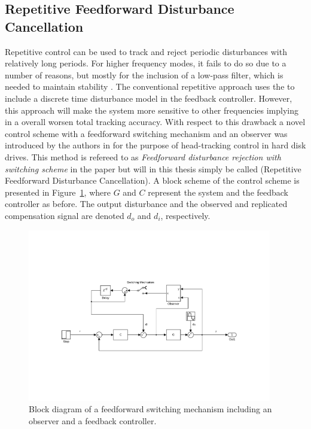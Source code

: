 \subsection{Repetitive Feedforward Disturbance Cancellation}
Repetitive control can be used to track and reject periodic disturbances with relatively long periods. For higher frequency modes, it fails to do so due to a number of reasons, but mostly for the inclusion of a low-pass filter, which is needed to maintain stability \citep{fujimoto2009rro}. The conventional repetitive approach uses the \abbrIMP to include a discrete time disturbance model in the feedback controller. However, this approach will make the system more sensitive to other frequencies implying in a overall worsen total tracking accuracy. With respect to this drawback a novel control scheme with a feedforward switching mechanism and an observer was introduced by the authors in \citep{fujimoto2004repetitive} for the purpose of head-tracking control in hard disk drives. This method is refereed to as \emph{Feedforward disturbance rejection with switching
scheme} in the paper but will in this thesis simply be called \abbrRFDC (Repetitive Feedforward Disturbance Cancellation). A block scheme of the control scheme is presented in Figure~\ref{fig:ffrep}, where $G$ and $C$ represent the system and the feedback controller as before. The output disturbance and the observed and replicated compensation signal are denoted $d_o$ and $d_i$, respectively.

\begin{figure}[h]
  \centering %
  \includegraphics[width=0.95\textwidth, trim=6cm 5.5cm 5.2cm 5.5cm, clip=true]{fig/matlab/ffrep}
  \caption{\label{fig:ffrep}Block diagram of a feedforward switching mechanism including an observer and a feedback controller.}
\end{figure}


